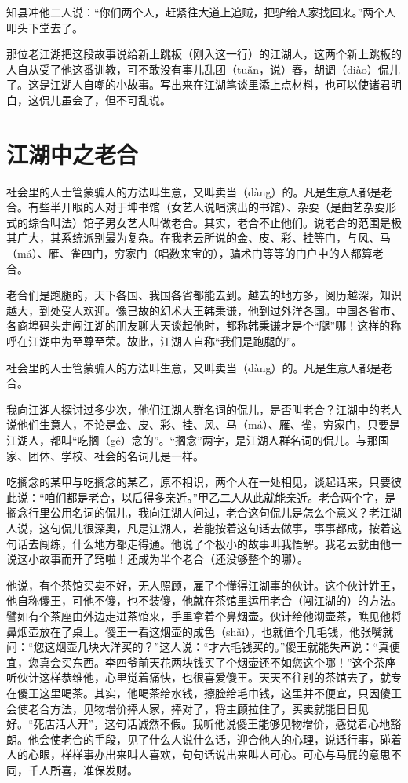 \documentclass[12pt,UTF8]{ctexbook}
\begin{document}
知县冲他二人说：“你们两个人，赶紧往大道上追贼，把驴给人家找回来。”两个人叩头下堂去了。



那位老江湖把这段故事说给新上跳板（刚入这一行）的江湖人，这两个新上跳板的人自从受了他这番训教，可不敢没有事儿乱团（tuǎn，说）春，胡调（diào）侃儿了。这是江湖人自嘲的小故事。写出来在江湖笔谈里添上点材料，也可以使诸君明白，这侃儿虽会了，但不可乱说。





\section{江湖中之老合}


社会里的人士管蒙骗人的方法叫生意，又叫卖当（dàng）的。凡是生意人都是老合。有些半开眼的人对于坤书馆（女艺人说唱演出的书馆）、杂耍（是曲艺杂耍形式的综合叫法）馆子男女艺人叫做老合。其实，老合不止他们。说老合的范围是极其广大，其系统派别最为复杂。在我老云所说的金、皮、彩、挂等门，与风、马（má）、雁、雀四门，穷家门（唱数来宝的），骗术门等等的门户中的人都算老合。

老合们是跑腿的，天下各国、我国各省都能去到。越去的地方多，阅历越深，知识越大，到处受人欢迎。像已故的幻术大王韩秉谦，他到过外洋各国。中国各省市、各商埠码头走闯江湖的朋友聊大天谈起他时，都称韩秉谦才是个“腿”哪！这样的称呼在江湖中为至尊至荣。故此，江湖人自称“我们是跑腿的”。

社会里的人士管蒙骗人的方法叫生意，又叫卖当（dàng）的。凡是生意人都是老合。



我向江湖人探讨过多少次，他们江湖人群名词的侃儿，是否叫老合？江湖中的老人说他们生意人，不论是金、皮、彩、挂、风、马（má）、雁、雀，穷家门，只要是江湖人，都叫“吃搁（gé）念的”。“搁念”两字，是江湖人群名词的侃儿。与那国家、团体、学校、社会的名词儿是一样。

吃搁念的某甲与吃搁念的某乙，原不相识，两个人在一处相见，谈起话来，只要彼此说：“咱们都是老合，以后得多亲近。”甲乙二人从此就能亲近。老合两个字，是搁念行里公用名词的侃儿，我向江湖人问过，老合这句侃儿是怎么个意义？老江湖人说，这句侃儿很深奥，凡是江湖人，若能按着这句话去做事，事事都成，按着这句话去闯练，什么地方都走得通。他说了个极小的故事叫我悟解。我老云就由他一说这小故事而开了窍啦！还成为半个老合（还没够整个的哪）。

他说，有个茶馆买卖不好，无人照顾，雇了个懂得江湖事的伙计。这个伙计姓王，他自称傻王，可他不傻，也不装傻，他就在茶馆里运用老合（闯江湖的）的方法。譬如有个茶座由外边走进茶馆来，手里拿着个鼻烟壶。伙计给他沏壶茶，瞧见他将鼻烟壶放在了桌上。傻王一看这烟壶的成色（shǎi），也就值个几毛钱，他张嘴就问：“您这烟壶几块大洋买的？”这人说：“才六毛钱买的。”傻王就能失声说：“真便宜，您真会买东西。李四爷前天花两块钱买了个烟壶还不如您这个哪！”这个茶座听伙计这样恭维他，心里觉着痛快，也很喜爱傻王。天天不往别的茶馆去了，就专在傻王这里喝茶。其实，他喝茶给水钱，擦脸给毛巾钱，这里并不便宜，只因傻王会使老合方法，见物增价捧人家，捧对了，将主顾拉住了，买卖就能日日见好。“死店活人开”，这句话诚然不假。我听他说傻王能够见物增价，感觉着心地豁朗。他会使老合的手段，见了什么人说什么话，迎合他人的心理，说话行事，碰着人的心眼，样样事办出来叫人喜欢，句句话说出来叫人可心。可心与马屁的意思不同，千人所喜，准保发财。
\end{document}
